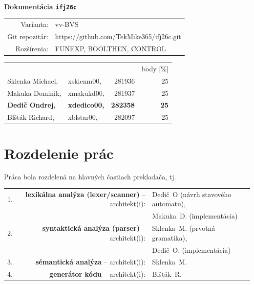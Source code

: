 \documentclass[11pt,a4paper]{article}
\def\variant{vv-BVS}
\def\repo{https://github.com/TekMike365/ifj26c.git}
\def\extensions{FUNEXP, BOOLTHEN, CONTROL}
\begin{document}
  \begin{titlepage}
    \vspace*{40mm}

    \centering \Huge
    \textbf{Dokumentácia \texttt{ifj26c}}
    \vspace{1.25em}

    \centering \Large
    \begin{tabularx}{\textwidth}{||r X}
           Varianta: &\variant \\
      Git repozitár: &\repo \\
         Rozšírenia: &\extensions \\
    \end{tabularx}

    \vfill

    \raggedleft \Large
    \begin{tabular}{l l r|r}
      \hline\hline
                       &           &       & body [\%] \\
      Sklenka Michael, &xsklenm00, &281936 & 25 \\
      Makuka Dominik,  &xmakukd00, &281937 & 25 \\

      \bfseries Dedič Ondrej, &\bfseries xdedico00, &\bfseries 282358
      & \bfseries 25 \\

      Blšták Richard,  &xblstar00, &282097 & 25 \\
    \end{tabular}
  \end{titlepage}

  \tableofcontents
  \newpage

  \section{Rozdelenie prác}

  Práca bola rozdelená na hlavných častiach prekladača, tj.

  \begin{tabular}{lrl}
    1. & \textbf{lexikálna analýza (lexer/scanner)} -- architekt(i): & Dedič~O (návrh stavového automatu), \\
       &                                                          & Makuka~D. (implementácia) \\
    2. & \textbf{syntaktická analýza (parser)}      -- architekt(i): & Sklenka~M. (prvotná gramatika), \\
       &                                                             & Dedič~O. (implementácia) \\
    3. & \textbf{sémantická analýza}                -- architekt(i): & Sklenka~M. \\
    4. & \textbf{generátor kódu}                    -- architekt(i): & Blšták~R. \\
  \end{tabular}
\end{document}

